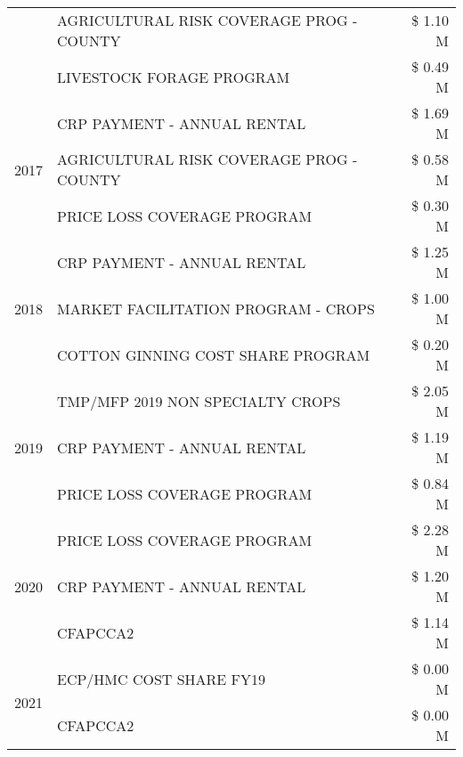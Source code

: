 \begin{tabular}{llr}
 & AGRICULTURAL RISK COVERAGE PROG - COUNTY & \$ 1.10 M \\
 & LIVESTOCK FORAGE PROGRAM & \$ 0.49 M \\
\cline{1-3}
\multirow[t]{3}{*}{2017} & CRP PAYMENT - ANNUAL RENTAL & \$ 1.69 M \\
 & AGRICULTURAL RISK COVERAGE PROG - COUNTY & \$ 0.58 M \\
 & PRICE LOSS COVERAGE PROGRAM & \$ 0.30 M \\
\cline{1-3}
\multirow[t]{3}{*}{2018} & CRP PAYMENT - ANNUAL RENTAL & \$ 1.25 M \\
 & MARKET FACILITATION PROGRAM - CROPS & \$ 1.00 M \\
 & COTTON GINNING COST SHARE PROGRAM & \$ 0.20 M \\
\cline{1-3}
\multirow[t]{3}{*}{2019} & TMP/MFP 2019 NON SPECIALTY CROPS & \$ 2.05 M \\
 & CRP PAYMENT - ANNUAL RENTAL & \$ 1.19 M \\
 & PRICE LOSS COVERAGE PROGRAM & \$ 0.84 M \\
\cline{1-3}
\multirow[t]{3}{*}{2020} & PRICE LOSS COVERAGE PROGRAM & \$ 2.28 M \\
 & CRP PAYMENT - ANNUAL RENTAL & \$ 1.20 M \\
 & CFAPCCA2 & \$ 1.14 M \\
\cline{1-3}
\multirow[t]{2}{*}{2021} & ECP/HMC COST SHARE FY19 & \$ 0.00 M \\
 & CFAPCCA2 & \$ 0.00 M \\
\cline{1-3}
\bottomrule
\end{tabular}
